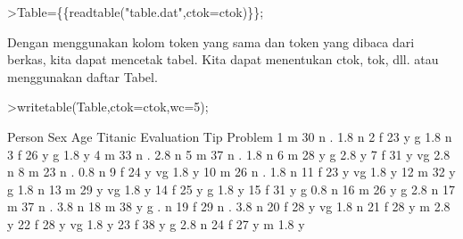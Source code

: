 \documentclass[a4paper,10pt]{article}
\begin{document}
\begin{eulernotebook}
\begin{eulercomment}
\begin{eulercomment}
\begin{eulercomment}
\begin{eulercomment}
\begin{eulercomment}
\begin{eulercomment}
\begin{eulercomment}
\begin{eulercomment}
\begin{eulercomment}
\begin{eulercomment}
\begin{eulercomment}
\begin{eulercomment}
\begin{eulercomment}
\begin{eulercomment}
\begin{eulercomment}
\begin{eulercomment}
\begin{eulercomment}
\begin{eulercomment}
\begin{eulercomment}
\begin{eulercomment}
\begin{eulercomment}
\begin{eulercomment}
\begin{eulercomment}
\begin{eulercomment}
\begin{eulercomment}
\begin{eulercomment}
\begin{eulercomment}
\begin{eulercomment}
\begin{eulercomment}
\begin{eulercomment}
\begin{eulercomment}
\begin{eulercomment}
\begin{eulercomment}
\end{eulercomment}
\begin{eulerprompt}
>Table=\{\{readtable("table.dat",ctok=ctok)\}\};
\end{eulerprompt}
\begin{eulercomment}
Dengan menggunakan kolom token yang sama dan token yang dibaca dari
berkas, kita dapat mencetak tabel. Kita dapat menentukan ctok, tok,
dll. atau menggunakan daftar Tabel.
\end{eulercomment}
\begin{eulerprompt}
>writetable(Table,ctok=ctok,wc=5);
\end{eulerprompt}
\begin{euleroutput}
   Person  Sex  Age Titanic Evaluation  Tip Problem
        1    m   30       n          .  1.8       n
        2    f   23       y          g  1.8       n
        3    f   26       y          g  1.8       y
        4    m   33       n          .  2.8       n
        5    m   37       n          .  1.8       n
        6    m   28       y          g  2.8       y
        7    f   31       y         vg  2.8       n
        8    m   23       n          .  0.8       n
        9    f   24       y         vg  1.8       y
       10    m   26       n          .  1.8       n
       11    f   23       y         vg  1.8       y
       12    m   32       y          g  1.8       n
       13    m   29       y         vg  1.8       y
       14    f   25       y          g  1.8       y
       15    f   31       y          g  0.8       n
       16    m   26       y          g  2.8       n
       17    m   37       n          .  3.8       n
       18    m   38       y          g    .       n
       19    f   29       n          .  3.8       n
       20    f   28       y         vg  1.8       n
       21    f   28       y          m  2.8       y
       22    f   28       y         vg  1.8       y
       23    f   38       y          g  2.8       n
       24    f   27       y          m  1.8       y

\end{euleroutput}
\end{eulercomment}
\end{eulercomment}
\end{eulercomment}
\end{eulercomment}
\end{eulercomment}
\end{eulercomment}
\end{eulercomment}
\end{eulercomment}
\end{eulercomment}
\end{eulercomment}
\end{eulercomment}
\end{eulercomment}
\end{eulercomment}
\end{eulercomment}
\end{eulercomment}
\end{eulercomment}
\end{eulercomment}
\end{eulercomment}
\end{eulercomment}
\end{eulercomment}
\end{eulercomment}
\end{eulercomment}
\end{eulercomment}
\end{eulercomment}
\end{eulercomment}
\end{eulercomment}
\end{eulercomment}
\end{eulercomment}
\end{eulercomment}
\end{eulercomment}
\end{eulercomment}
\end{eulercomment}
\end{eulernotebook}
\end{document}
